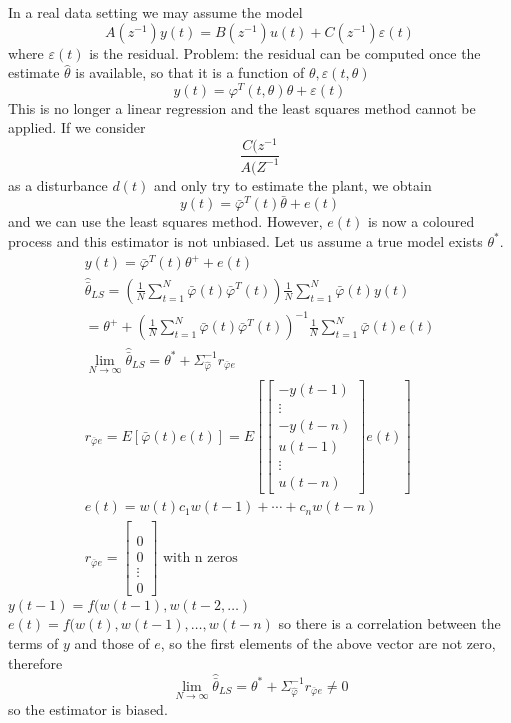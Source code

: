 \documentclass{book}
\begin{document}
In a real data setting we may assume the model
\[
    A(z^{-1})y(t)=B(z^{-1})u(t)+C(z^{-1})\varepsilon(t)
\]
where $\varepsilon(t)$ is the residual. Problem: the residual can be computed once the estimate $\hat{\theta}$ is available, so that it is a function of $\theta,\varepsilon(t,\theta)$
\[
    y(t)=\varphi^T(t,\theta)\theta+\varepsilon(t)
\]
This is no longer a linear regression and the least squares method cannot be applied.
If we consider 
\[
    \frac{C(z^{-1}}{A(Z^{-1}}
\]
as a disturbance $d(t)$ and only try to estimate the plant, we obtain
\[
    y(t)=\bar{\varphi}^T(t)\bar{\theta}+e(t)
\]
and we can use the least squares method. However, $e(t)$ is now a coloured process and this estimator is not unbiased. Let us assume a true model exists $\theta^*$.
\begin{gather*}
    y(t)=\bar{\varphi}^T(t)\theta^++e(t)\\
    \hat{\bar{\theta}}_{LS} = \left( \frac{1}{N} \sum_{t=1}^N \bar{\varphi}(t)\bar{\varphi}^T(t)\right) \frac{1}{N} \sum_{t=1}^N \bar{\varphi}(t)y(t)\\
    =\theta^+ + \left(\frac{1}{N}\sum_{t=1}^N \bar{\varphi}(t)\bar{\varphi}^T(t)\right)^{-1}\frac{1}{N}\sum_{t=1}^N \bar{\varphi}(t)e(t)\\
    \lim_{N\to\infty} \hat{\bar{\theta}}_{LS}=\theta^*+\Sigma_{\hat{\varphi}}^{-1}r_{\bar{\varphi}e}\\
    r_{\bar{\varphi}e}=E[\bar{\varphi}(t)e(t)] = E [ \begin{bmatrix}
    -y(t-1) \\ \vdots \\ -y(t-n) \\ u(t-1) \\ \vdots \\ u(t-n) \end{bmatrix} e(t)]\\
    e(t) = w(t) c_1w(t-1)+ \cdots + c_nw(t-n)\\
    r_{\bar{\varphi}e} = \begin{bmatrix} \\ \\ 0 \\ 0 \\ \vdots \\ 0 \end{bmatrix} \text{ with n zeros}
\end{gather*}
$y(t-1) = f(w(t-1), w(t-2, \dots )$\\
$e(t) = f(w(t), w(t-1), \dots, w(t-n)$ so there is a correlation between the terms of $y$ and those of $e$, so the first elements of the above vector are not zero, therefore
\[
    \lim_{N\to\infty} \hat{\bar{\theta}}_{LS}=\theta^*+\Sigma_{\hat{\varphi}}^{-1}r_{\bar{\varphi}e}\neq 0
\]
so the estimator is biased.
\end{document}
